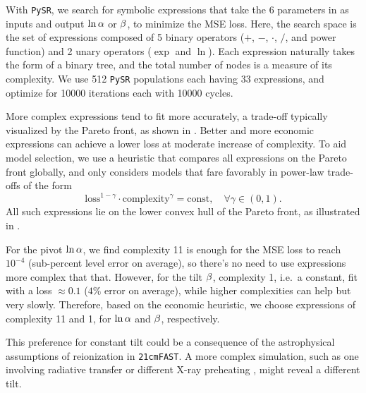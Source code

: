 With \texttt{PySR}, we search for symbolic expressions that take the 6
parameters in  as inputs and output $\ln\alpha$ or $\beta$,
to minimize the MSE loss.
Here, the search space is the set of expressions composed of 5 binary
operators ($+$, $-$, $\cdot$, $/$, and power function) and 2 unary
operators ($\exp$ and $\ln$).
Each expression naturally takes the form of a binary tree, and the
total number of nodes is a measure of its complexity.
We use 512 \texttt{PySR} populations each having 33 expressions, and
optimize for 10000 iterations each with 10000 cycles.

More complex expressions tend to fit more accurately, a trade-off
typically visualized by the Pareto front, as shown in .
Better and more economic expressions can achieve a lower loss at
moderate increase of complexity.
To aid model selection, we use a heuristic that compares all expressions
on the Pareto front globally, and only considers models that fare
favorably in power-law trade-offs of the form
%
\begin{equation}
\mathrm{loss}^{1 - \gamma} \cdot \mathrm{complexity}^\gamma
= \mathrm{const}, \quad \forall \gamma \in (0, 1).
\end{equation}
All such expressions lie on the lower convex hull of the Pareto front,
as illustrated in .

For the pivot $\ln\alpha$, we find complexity 11 is enough for the MSE loss
to reach $10^{-4}$ (sub-percent level error on average), so there's no
need to use expressions more complex that that.
However, for the tilt $\beta$, complexity 1, i.e.\ a constant, fit with
a loss $\approx 0.1$ ($4\%$ error on average), while higher complexities
can help but very slowly.
Therefore, based on the economic heuristic, we choose expressions of
complexity 11 and 1, for $\ln\alpha$ and $\beta$, respectively.

This preference for constant tilt could be a consequence of the
astrophysical assumptions of reionization in \texttt{21cmFAST}.
A more complex simulation, such as one involving radiative transfer or
different X-ray preheating \cite{Montero2024}, might reveal a different
tilt.

